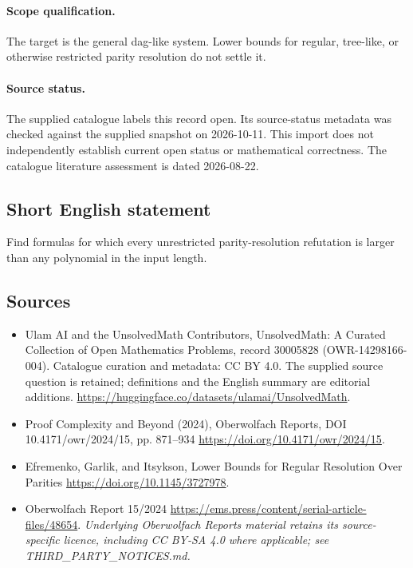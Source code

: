 \documentclass[11pt]{article}
\begin{document}
\paragraph{Scope qualification.}
The target is the general dag-like system. Lower bounds for regular, tree-like, or otherwise restricted parity resolution do not settle it.
\paragraph{Source status.}
The supplied catalogue labels this record open. Its source-status metadata was checked against the supplied snapshot on 2026-10-11. This import does not independently establish current open status or mathematical correctness. The catalogue literature assessment is dated 2026-08-22.
\subsection{Short English statement}
Find formulas for which every unrestricted parity-resolution refutation is larger than any polynomial in the input length.
\subsection{Sources}
\begin{itemize}
\item[S1] Ulam AI and the UnsolvedMath Contributors, UnsolvedMath: A Curated Collection of Open Mathematics Problems, record 30005828 (OWR-14298166-004). Catalogue curation and metadata: CC BY 4.0. The supplied source question is retained; definitions and the English summary are editorial additions.
\url{https://huggingface.co/datasets/ulamai/UnsolvedMath}.
\item[S2] Proof Complexity and Beyond (2024), Oberwolfach Reports, DOI 10.4171/owr/2024/15, pp. 871--934
\url{https://doi.org/10.4171/owr/2024/15}.
\item[S3] Efremenko, Garlik, and Itsykson, Lower Bounds for Regular Resolution Over Parities
\url{https://doi.org/10.1145/3727978}.
\item[S4] Oberwolfach Report 15/2024
\url{https://ems.press/content/serial-article-files/48654}.
\textit{Underlying Oberwolfach Reports material retains its source-specific licence, including CC BY-SA 4.0 where applicable; see THIRD\_PARTY\_NOTICES.md.}
\end{itemize}
\end{document}
